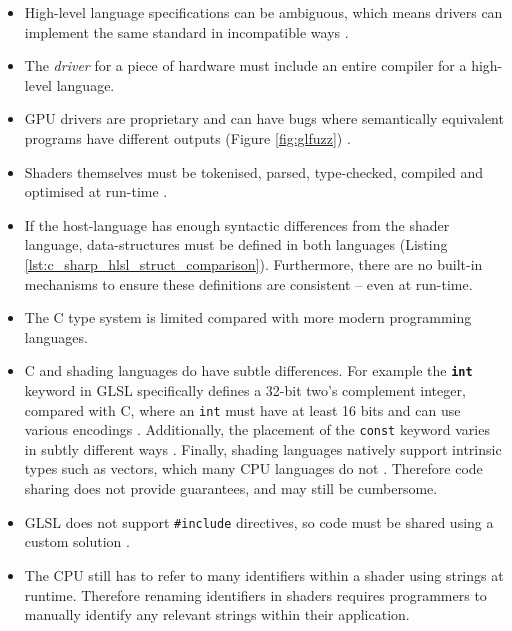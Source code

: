 \documentclass[a4paper,12pt,twoside,openright]{report}
\begin{document}
\begin{itemize}

    \item High-level language specifications can be ambiguous, which means
    drivers can implement the same standard in incompatible ways \cite{TODO}.

    \item The \textit{driver} for a piece of hardware must include an entire
    compiler for a high-level language.

    \item GPU drivers are proprietary and can have bugs where semantically
    equivalent programs have different outputs (Figure \ref{fig:glfuzz})
    \cite{GLFuzz}.

    \item Shaders themselves must be tokenised, parsed, type-checked, compiled
    and optimised at run-time \cite{TODO}.

    \item If the host-language has enough syntactic differences from the shader
    language, data-structures must be defined in both languages (Listing
    \ref{lst:c_sharp_hlsl_struct_comparison}). Furthermore, there are no
    built-in mechanisms to ensure these definitions are consistent -- even at
    run-time.

    \item The C type system is limited compared with more modern programming
    languages.

    \item C and shading languages do have subtle differences. For example the
    \textbf{\texttt{int}} keyword in GLSL specifically defines a 32-bit two's
    complement integer, compared with C, where an \texttt{int} must have at
    least 16 bits and can use various encodings \cite{TODO}. Additionally, the
    placement of the \texttt{const} keyword varies in subtly different ways
    \cite{TODO}. Finally, shading languages natively support intrinsic types
    such as vectors, which many CPU languages do not \cite{TODO}. Therefore
    code sharing does not provide guarantees, and may still be cumbersome.

    \item GLSL does not support \texttt{\#include} directives, so code must be
    shared using a custom solution \cite{TODO}.

    \item The CPU still has to refer to many identifiers within a shader using
    strings at runtime. Therefore renaming identifiers in shaders requires
    programmers to manually identify any relevant strings within their
    application.


\end{itemize}
\end{document}
